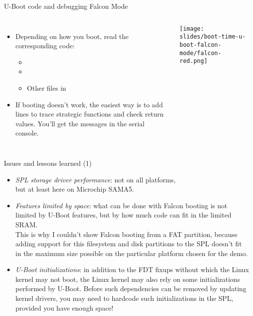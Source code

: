 \begin{frame}{U-Boot code and debugging Falcon Mode}
  \begin{columns}
  \begin{itemize}
     \item Depending on how you boot, read the corresponding code:
        \begin{itemize}
           \item {}
           \item {}
           \item Other files in 
        \end{itemize}
     \item If booting doesn't work, the easiest way is to add
            lines to trace strategic functions
           and check return values. You'll get the messages in the
           serial console.
  \end{itemize}
    \begin{center}
     \texttt{[image: slides/boot-time-u-boot-falcon-mode/falcon-red.png]}
    \end{center}
  \end{columns}
\end{frame}

\begin{frame}{Issues and lessons learned (1)}
   \begin{itemize}
      \item {\em SPL storage driver performance}: not on all platforms,\\
            but at least here on Microchip SAMA5.
      \item {\em Features limited by space}: what can be done with
            Falcon booting is not limited by U-Boot features, but by how much code
            can fit in the limited SRAM.\\
            This is why I couldn't show Falcon booting from a FAT
            partition, because adding support for this filesystem and disk partitions to
            the SPL doesn't fit in the maximum size possible on the particular
            platform chosen for the demo.
      \item {\em U-Boot initializations}: in addition to the FDT fixups without which
            the Linux kernel may not boot, the Linux kernel may also rely on some
            initializations performed by U-Boot. Before such dependencies
            can be removed by updating kernel drivers, you may need to
            hardcode such initializations in the SPL, provided you have enough
            space!
   \end{itemize}
\end{frame}

